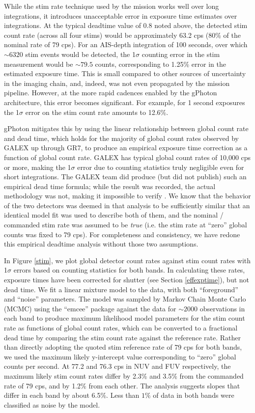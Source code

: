 \documentclass[trackchanges,preprint2]{aastex}
\begin{document}
While the stim rate technique used by the mission works well over long integrations, it introduces unacceptable error in exposure time estimates over  integrations. At the typical deadtime value of 0.8 noted above, the detected stim count rate (across all four stims) would be approximately 63.2 cps (80\% of the nominal rate of 79 cps). For an AIS-depth integration of 100 seconds, over which $\sim 6320$ stim events would be detected, the 1$\sigma$ counting error in the stim measurement would be $\sim 79.5$ counts, corresponding to 1.25\% error in the estimated exposure time. This is small compared to other sources of uncertainty in the imaging chain, and, indeed, was not even propagated by the mission pipeline. However, at the more rapid cadences enabled by the gPhoton architecture, this error becomes significant. For example, for 1 second exposures the 1$\sigma$ error on the stim count rate amounts to 12.6\%.

gPhoton mitigates this by using the linear relationship between global count rate and dead time, which holds for the majority of global count rates observed by GALEX up through GR7, to produce an empirical exposure time correction as a function of global count rate. GALEX has typical global count rates of 10,000 cps or more, making the 1$\sigma$ error due to counting statistics truly negligible even for short integrations. The GALEX team did produce (but did not publish) such an empirical dead time formula; while the result was recorded, the actual methodology was not, making it impossible to verify \citep{mor2013}. We know that the behavior of the two detectors was deemed in that analysis to be sufficiently similar that an identical model fit was used to describe both of them, and the nominal / commanded stim rate was assumed to be \emph{true} (i.e. the stim rate at ``zero'' global counts was fixed to 79 cps). For completeness and consistency, we have redone this empirical deadtime analysis without those two assumptions.

In Figure \ref{stim}, we plot global detector count rates against stim count rates with 1$\sigma$ errors based on counting statistics for both bands. In calculating these rates, exposure times have been corrected for shutter (see Section \ref{effexptime}), but not dead time. We fit a linear mixture model to the data, with both ``foreground'' and ``noise'' parameters. The model was sampled by Markov Chain Monte Carlo (MCMC) using the ``emcee'' package \citep{for2013} against the data for $\sim 2000$ observations in each band to produce maximum likelihood model parameters for the stim count rate as functions of global count rates, which can be converted to a fractional dead time by comparing the stim count rate against the reference rate. Rather than directly adopting the quoted stim reference rate of 79 cps for both bands, we used the maximum likely y-intercept value corresponding to ``zero'' global counts per second. At 77.2 and 76.3 cps in NUV and FUV respectively, the maximum likely stim count rates differ by 2.3\% and 3.5\% from the commanded rate of 79 cps, and by 1.2\% from each other. The analysis suggests slopes that differ in each band by about 6.5\%. Less than $1\%$ of data in both bands were classified as noise by the model.
\end{document}
